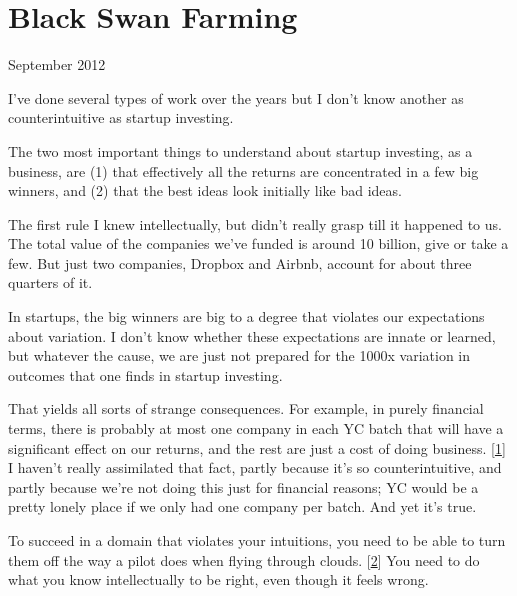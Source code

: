 \chapter{Black Swan Farming}


            
              
                


                  
                    September 2012

I've done several types of work
                    over the years but I don't know another as counterintuitive
                    as startup investing.

The two most important
                    things to understand about startup investing, as a business,
                    are (1) that effectively all the returns are concentrated in
                    a few big winners, and (2) that the best ideas look
                    initially like bad ideas.

The first rule I knew
                    intellectually, but didn't really grasp till it happened to
                    us. The total value of the companies we've funded is around
                    10 billion, give or take a few. But just two companies,
                    Dropbox and Airbnb, account for about three quarters of
                    it.

In startups, the big winners are big to a
                    degree that violates our expectations about variation. I
                    don't know whether these expectations are innate or learned,
                    but whatever the cause, we are just not prepared for the
                    1000x variation in outcomes that one finds in startup
                    investing.

That yields all sorts of strange
                    consequences. For example, in purely financial terms, there
                    is probably at most one company in each YC batch that will
                    have a significant effect on our returns, and the rest are
                    just a cost of doing business.
                    [\href{\#f1n}{1}]
                    I haven't really assimilated that fact, partly because it's
                    so counterintuitive, and partly because we're not doing this
                    just for financial reasons; YC would be a pretty lonely
                    place if we only had one company per batch. And yet it's
                    true.

To succeed in a domain that violates your
                    intuitions, you need to be able to turn them off the way a
                    pilot does when flying through clouds.
                    [\href{\#f2n}{2}]
                    You need to do what you know intellectually to be right,
                    even though it feels wrong.

